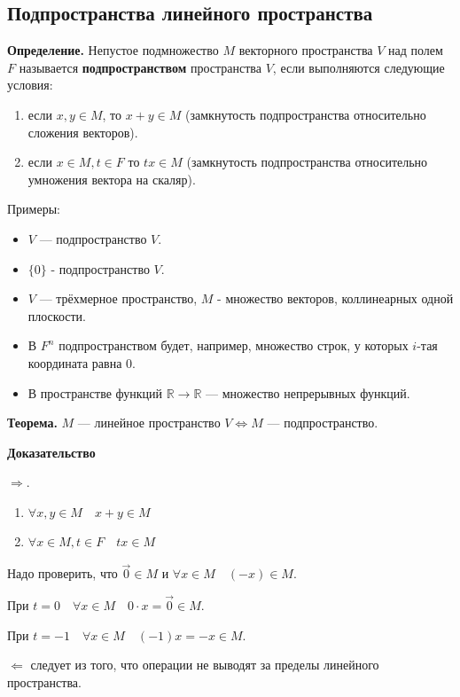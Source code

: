 \documentclass[a4paper]{article}
\begin{document}
    \newpage \begin{center}
                 \begin{Large}
                 \end{Large}
    \end{center}
    
    \subsection*{Подпространства линейного пространства}
    \textbf{Определение.} Непустое подмножество $M$ векторного пространства $V$ над полем $F$ называется \textbf{подпространством} пространства $V$, если выполняются следующие условия:
    \begin{enumerate}
        \item если $x,y \in M$, то $x+y \in M$ (замкнутость подпространства относительно сложения векторов).
        \item если $x \in M, t \in F$ то $tx \in M$ (замкнутость подпространства относительно умножения вектора на скаляр).
    \end{enumerate}

	Примеры:
	\begin{itemize}
		\item $V$ --- подпространство $V$.
		\item $\{ 0 \}$ - подпространство $V$.
		\item $V$ --- трёхмерное пространство, $M$ - множество векторов, коллинеарных одной плоскости.
		\item В $F^n$ подпространством будет, например, множество строк, у которых $i$-тая координата равна 0.
		\item В пространстве функций $\mathbb{R} \rightarrow \mathbb{R}$ --- множество непрерывных функций.
	\end{itemize}

	\begin{htheorem}
		\textbf{Теорема.} $M$ --- линейное пространство $V \Leftrightarrow M$ --- подпространство.
	\end{htheorem}
	
	\begin{hproof}
		\textbf{Доказательство}
		 
		$\Rightarrow$.
		\begin{enumerate}
			\item $\forall x, y \in M \quad x+y \in M$
			\item $\forall x \in M, t \in F \quad tx \in M$
		\end{enumerate}
		
		Надо проверить, что $\vec{0} \in M$ и $\forall x \in M \quad (-x) \in M$.
		
		При $t=0 \quad \forall x \in M \quad 0 \cdot x = \vec{0} \in M$.
		
		При $t=-1 \quad \forall x \in M \quad (-1)x = -x \in M$.
		
		$\Leftarrow$ следует из того, что операции не выводят за пределы линейного пространства.
	\end{hproof}	
	
\end{document}

